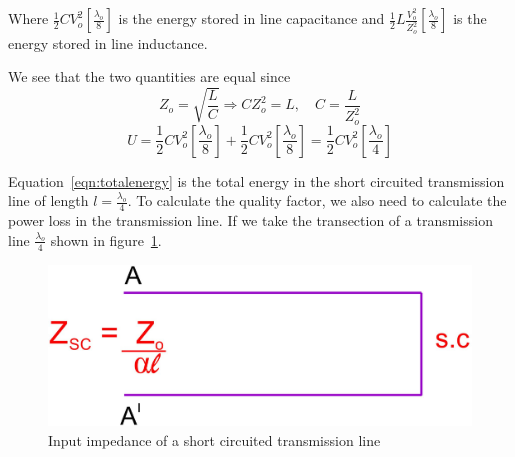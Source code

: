Where $\frac{1}{2}CV_{o}^{2}\left[\frac{\lambda_{o}}{8}\right] $ is the energy stored in line capacitance and $ \frac{1}{2}L\frac{V_{o}^{2}}{Z_{o}^{2}}\left[ \frac{\lambda_{o}}{8} \right] $ is the energy stored in line inductance.

We see that the two quantities are equal since
\begin{equation*}
Z_{o} = \sqrt{\frac{L}{C}}\Longrightarrow CZ_{o}^{2} = L,\quad C = \frac{L}{Z_{o}^{2}}
\end{equation*}
\begin{dmath}
U = \frac{1}{2}CV_{o}^{2}\left[\frac{\lambda_{o}}{8}\right] +\frac{1}{2}CV_{o}^{2}\left[\frac{\lambda_{o}}{8}\right]
= \frac{1}{2}CV_{o}^{2}\left[\frac{\lambda_{o}}{4}\right]
\label{eqn:totalenergy}
\end{dmath}

Equation~\eqref{eqn:totalenergy} is the total energy in the short circuited transmission line of length $l = \frac{\lambda_o}{4}$. To calculate the quality factor, we also need to calculate the power loss in the transmission line. If we take the transection of a transmission line $\frac{\lambda_{o}}{4}$ shown in figure~\ref{fig:fig4}.
\begin{figure}[h]
\centering
\includegraphics[width=1\linewidth]{./graphics/fig4}
\caption{Input impedance of a short circuited transmission line}
\label{fig:fig4}
\end{figure}

